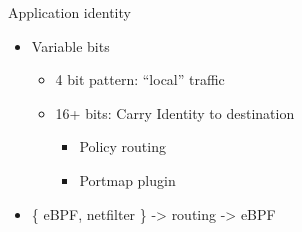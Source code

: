 \documentclass[black,white,aspectratio=169]{beamer}
\DeclareRobustCommand{\#}{\adjustbox{valign=B,totalheight=.57\baselineskip}{\oldhash}}%
\begin{document}
    \begin{frame}{Application identity}
        \begin{itemize}
            \item Variable bits~\smallskip
            \begin{itemize}
                \item 4 bit pattern: ``local'' traffic~\smallskip
                \item 16+ bits: Carry Identity to destination~\smallskip
                \begin{itemize}
                    \item Policy routing~\smallskip
                    \item Portmap plugin~\medskip
                \end{itemize}
            \end{itemize}
            \item \{ eBPF, netfilter \} -> routing -> eBPF~\medskip
        \end{itemize}
    \end{frame}
\end{document}
